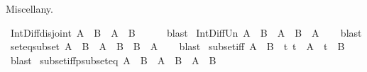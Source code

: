 \begin{isabellebody}
%
\endisadelimproof
%
\begin{isamarkuptext}%
\medskip Miscellany.%
\end{isamarkuptext}\isamarkuptrue%
\isamarkupfalse%
\ Int{\isacharunderscore}{\kern0pt}Diff{\isacharunderscore}{\kern0pt}disjoint{\isacharcolon}{\kern0pt}\ {\isachardoublequoteopen}A\ {\isasyminter}\ B\ {\isasyminter}\ {\isacharparenleft}{\kern0pt}A\ {\isacharminus}{\kern0pt}\ B{\isacharparenright}{\kern0pt}\ {\isacharequal}{\kern0pt}\ {\isacharbraceleft}{\kern0pt}{\isacharbraceright}{\kern0pt}{\isachardoublequoteclose}\isanewline
%
\isadelimproof
\ \ %
\endisadelimproof
%
\isatagproof
{}\isamarkupfalse%
\ blast%
\endisatagproof
{\isafoldproof}%
%
\isadelimproof
\isanewline
%
\endisadelimproof
\isanewline
{}\isamarkupfalse%
\ Int{\isacharunderscore}{\kern0pt}Diff{\isacharunderscore}{\kern0pt}Un{\isacharcolon}{\kern0pt}\ {\isachardoublequoteopen}A\ {\isasyminter}\ B\ {\isasymunion}\ {\isacharparenleft}{\kern0pt}A\ {\isacharminus}{\kern0pt}\ B{\isacharparenright}{\kern0pt}\ {\isacharequal}{\kern0pt}\ A{\isachardoublequoteclose}\isanewline
%
\isadelimproof
\ \ %
\endisadelimproof
%
\isatagproof
{}\isamarkupfalse%
\ blast%
\endisatagproof
{\isafoldproof}%
%
\isadelimproof
\isanewline
%
\endisadelimproof
\isanewline
{}\isamarkupfalse%
\ set{\isacharunderscore}{\kern0pt}eq{\isacharunderscore}{\kern0pt}subset{\isacharcolon}{\kern0pt}\ {\isachardoublequoteopen}A\ {\isacharequal}{\kern0pt}\ B\ {\isasymlongleftrightarrow}\ A\ {\isasymsubseteq}\ B\ {\isasymand}\ B\ {\isasymsubseteq}\ A{\isachardoublequoteclose}\isanewline
%
\isadelimproof
\ \ %
\endisadelimproof
%
\isatagproof
{}\isamarkupfalse%
\ blast%
\endisatagproof
{\isafoldproof}%
%
\isadelimproof
\isanewline
%
\endisadelimproof
\isanewline
{}\isamarkupfalse%
\ subset{\isacharunderscore}{\kern0pt}iff{\isacharcolon}{\kern0pt}\ {\isachardoublequoteopen}A\ {\isasymsubseteq}\ B\ {\isasymlongleftrightarrow}\ {\isacharparenleft}{\kern0pt}{\isasymforall}t{\isachardot}{\kern0pt}\ t\ {\isasymin}\ A\ {\isasymlongrightarrow}\ t\ {\isasymin}\ B{\isacharparenright}{\kern0pt}{\isachardoublequoteclose}\isanewline
%
\isadelimproof
\ \ %
\endisadelimproof
%
\isatagproof
{}\isamarkupfalse%
\ blast%
\endisatagproof
{\isafoldproof}%
%
\isadelimproof
\isanewline
%
\endisadelimproof
\isanewline
{}\isamarkupfalse%
\ subset{\isacharunderscore}{\kern0pt}iff{\isacharunderscore}{\kern0pt}psubset{\isacharunderscore}{\kern0pt}eq{\isacharcolon}{\kern0pt}\ {\isachardoublequoteopen}A\ {\isasymsubseteq}\ B\ {\isasymlongleftrightarrow}\ A\ {\isasymsubset}\ B\ {\isasymor}\ A\ {\isacharequal}{\kern0pt}\ B{\isachardoublequoteclose}\isanewline

\end{isabellebody}
